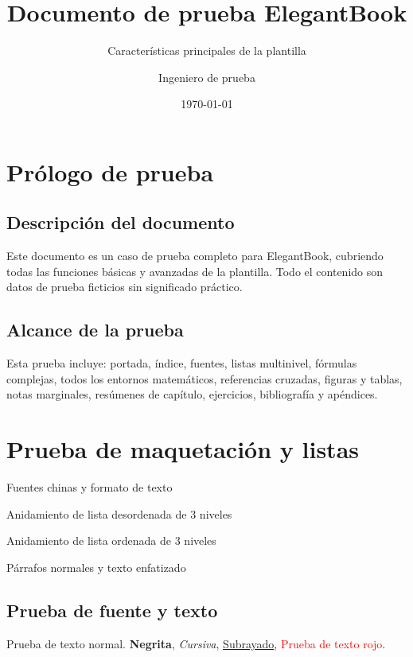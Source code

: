 \documentclass[es]{../../elegantbook}
\title{Documento de prueba ElegantBook}
\subtitle{Características principales de la plantilla}
\author{Ingeniero de prueba}
\institute{Grupo de prueba de plantillas}
\date{\today}
\begin{document}
\maketitle
\frontmatter
\tableofcontents

\setcounter{page}{0}
\chapter*{Prólogo de prueba}
\section*{Descripción del documento}
Este documento es un caso de prueba completo para ElegantBook, cubriendo todas las funciones básicas y avanzadas de la plantilla. Todo el contenido son datos de prueba ficticios sin significado práctico.
\newpage
\section*{Alcance de la prueba}
Esta prueba incluye: portada, índice, fuentes, listas multinivel, fórmulas complejas, todos los entornos matemáticos, referencias cruzadas, figuras y tablas, notas marginales, resúmenes de capítulo, ejercicios, bibliografía y apéndices.

\mainmatter

\chapter{Prueba de maquetación y listas}
\begin{introduction}
\item Fuentes chinas y formato de texto
\item Anidamiento de lista desordenada de 3 niveles
\item Anidamiento de lista ordenada de 3 niveles
\item Párrafos normales y texto enfatizado
\end{introduction}

\section{Prueba de fuente y texto}
Prueba de texto normal. \textbf{Negrita}, \textit{Cursiva}, \underline{Subrayado}, \textcolor{red}{Prueba de texto rojo}.
\end{document}
